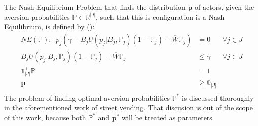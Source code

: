 \documentclass{article}
\newcommand{\pp}{\mathbf{p}}
\newcommand{\p}{\mathds{P}}
\begin{document}
The Nash Equilibrium Problem that finds the distribution $\pp$ of actors, given the aversion probabilities $\p \in \mathds{R}^{|J|}$, such that this is configuration is a Nash Equilibrium, is defined by (\citep{Carrasco}):
\begin{align*}
	NE(\p) :  \;\; p_j(\gamma -B_j U(p_j\vert B_j, \p_j)(1-\p_j) - \overline{W}\p_j) &= 0 & \forall j \in J\\
	B_j U(p_j\vert B_j, \p_j)(1-\p_j) - \overline{W}\p_j &\leq \gamma& \forall j \in J\\
	\mathbb{1}^{\top}_{|J|}\p  &= 1&\\
	\pp &\geq \mathbb{0}_{|J|}& \\
\end{align*} 
The problem of finding optimal aversion probabilities $\p^*$ is discussed thoroughly in the aforementioned work of street vending. That discusion is out of the scope of this work, because both $\p^*$ and $\pp^*$ will be treated as parameters.\par
\end{document}
